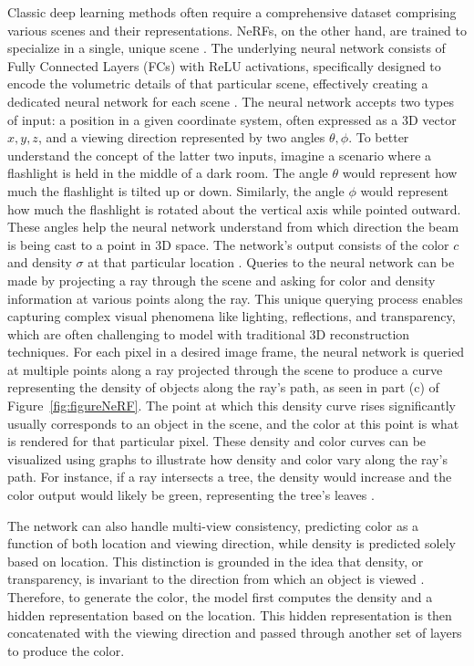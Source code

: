 Classic deep learning methods often require a comprehensive dataset comprising various scenes and their representations. NeRFs, on the other hand, are trained to specialize in a single, unique scene \citep{mildenhallNERF}. The underlying neural network consists of Fully Connected Layers (FCs) with ReLU activations, specifically designed to encode the volumetric details of that particular scene, effectively creating a dedicated neural network for each scene \citep{mildenhallNERF}. The neural network accepts two types of input: a position in a given coordinate system, often expressed as a 3D vector \(x, y, z\), and a viewing direction represented by two angles \( \theta, \phi \). To better understand the concept of the latter two inputs, imagine a scenario where a flashlight is held in the middle of a dark room. The angle \( \theta \) would represent how much the flashlight is tilted up or down. Similarly, the angle \( \phi \) would represent how much the flashlight is rotated about the vertical axis while pointed outward. These angles help the neural network understand from which direction the beam is being cast to a point in 3D space. The network's output consists of the color \(c\) and density \( \sigma \) at that particular location \citep{mildenhallNERF}. Queries to the neural network can be made by projecting a ray through the scene and asking for color and density information at various points along the ray. This unique querying process enables capturing complex visual phenomena like lighting, reflections, and transparency, which are often challenging to model with traditional 3D reconstruction techniques. For each pixel in a desired image frame, the neural network is queried at multiple points along a ray projected through the scene to produce a curve representing the density of objects along the ray's path, as seen in part (c) of Figure~\ref{fig:figureNeRF}. The point at which this density curve rises significantly usually corresponds to an object in the scene, and the color at this point is what is rendered for that particular pixel. These density and color curves can be visualized using graphs to illustrate how density and color vary along the ray's path. For instance, if a ray intersects a tree, the density would increase and the color output would likely be green, representing the tree's leaves \citep{mildenhallNERF}.

The network can also handle multi-view consistency, predicting color as a function of both location and viewing direction, while density is predicted solely based on location. This distinction is grounded in the idea that density, or transparency, is invariant to the direction from which an object is viewed \citep{hu2023consistentnerf}. Therefore, to generate the color, the model first computes the density and a hidden representation based on the location. This hidden representation is then concatenated with the viewing direction and passed through another set of layers to produce the color.

